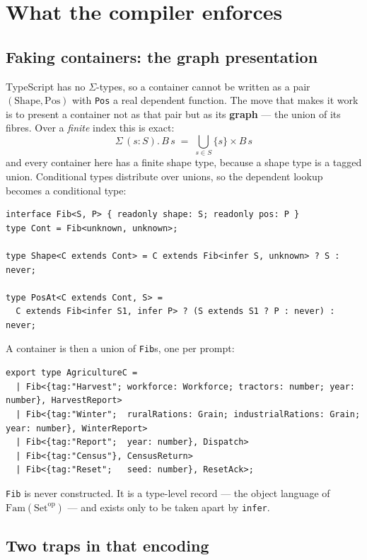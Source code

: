 \documentclass[11pt,a4paper]{article}
\begin{document}
\section{What the compiler enforces}

\subsection{Faking containers: the graph presentation}

TypeScript has no $\Sigma$-types, so a container cannot be written as a pair
$(\mathrm{Shape}, \mathrm{Pos})$ with \texttt{Pos} a real dependent function.
The move that makes it work is to present a container not as that pair but as
its \textbf{graph} --- the union of its fibres. Over a \emph{finite} index this
is exact:
\[
  \Sigma\,(s : S).\,B\,s \;=\; \bigcup_{s \in S} \{s\} \times B\,s
\]
and every container here has a finite shape type, because a shape type is a
tagged union. Conditional types distribute over unions, so the dependent lookup
becomes a conditional type:

\begin{lstlisting}
interface Fib<S, P> { readonly shape: S; readonly pos: P }
type Cont = Fib<unknown, unknown>;

type Shape<C extends Cont> = C extends Fib<infer S, unknown> ? S : never;

type PosAt<C extends Cont, S> =
  C extends Fib<infer S1, infer P> ? (S extends S1 ? P : never) : never;
\end{lstlisting}

\noindent A container is then a union of \texttt{Fib}s, one per prompt:

\begin{lstlisting}
export type AgricultureC =
  | Fib<{tag:"Harvest"; workforce: Workforce; tractors: number; year: number}, HarvestReport>
  | Fib<{tag:"Winter";  ruralRations: Grain; industrialRations: Grain; year: number}, WinterReport>
  | Fib<{tag:"Report";  year: number}, Dispatch>
  | Fib<{tag:"Census"}, CensusReturn>
  | Fib<{tag:"Reset";   seed: number}, ResetAck>;
\end{lstlisting}

\noindent \texttt{Fib} is never constructed. It is a type-level record --- the
object language of $\mathrm{Fam}(\mathrm{Set}^{\mathrm{op}})$ --- and exists
only to be taken apart by \texttt{infer}.

\subsection{Two traps in that encoding}
\end{document}
